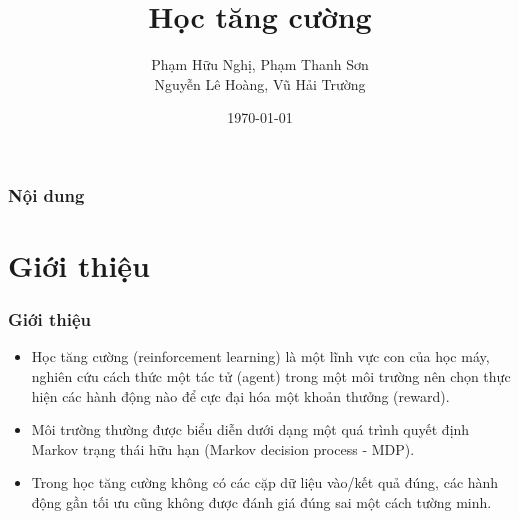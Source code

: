 \documentclass{beamer}
\title[Học tăng cường]{Học tăng cường} %
\author{Phạm Hữu Nghị, Phạm Thanh Sơn\\ Nguyễn Lê Hoàng, Vũ Hải Trường} %
\institute[UCLA] %
{
Giáo viên hướng dẫn: TS. Nguyễn Thị Ngọc Anh \\ %
\medskip
}
\date{\today} %
\begin{document}
\begin{frame}
\titlepage %
\end{frame}

\begin{frame}
\frametitle{Nội dung} %
\tableofcontents %
\end{frame}


\section{Giới thiệu} %

\begin{frame}
\frametitle{Giới thiệu}
\begin{itemize}
\item Học tăng cường (reinforcement learning) là một lĩnh vực con của học máy, nghiên cứu cách thức một tác tử (agent) trong một môi trường nên chọn thực hiện các hành động nào để cực đại hóa một khoản thưởng (reward).
\item Môi trường thường được biểu diễn dưới dạng một quá trình quyết định Markov trạng thái hữu hạn (Markov decision process - MDP).
\item Trong học tăng cường không có các cặp dữ liệu vào/kết quả đúng, các hành động gần tối ưu cũng không được đánh giá đúng sai một cách tường minh.
\end{itemize}
\end{frame}
\end{document}
